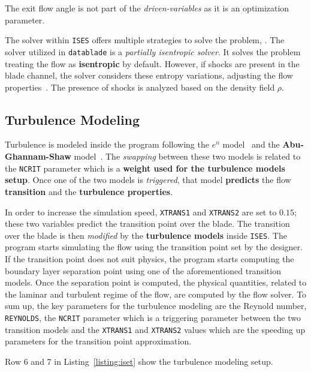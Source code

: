 The exit flow angle is not part of the \textit{driven-variables} as it is an optimization parameter.

The solver within \texttt{ISES} offers multiple strategies to solve the problem, \cite[Ch. 4]{drela1998user}. The solver utilized in \texttt{datablade} is a \textit{partially isentropic solver}. It solves the problem treating the flow as \textbf{isentropic} by default. However, if shocks are present in the blade channel, the solver considers these entropy variations, adjusting the flow properties~\cite{youngren1991viscous}. 
The presence of shocks is analyzed based on the density field $\rho$.

\subsection{Turbulence Modeling}

Turbulence is modeled inside the program \cite[Ch. 4]{drela1998user} following the $e^n$ model~\cite{drela1995mises} and the \textbf{Abu-Ghannam-Shaw} model~\cite{drela1995mises}. The \textit{swapping} between these two models is related to the \texttt{NCRIT} parameter which is a \textbf{weight used for the turbulence models setup}.
Once one of the two models is \textit{triggered}, that model \textbf{predicts} the flow \textbf{transition} and the \textbf{turbulence properties}. 
 
In order to increase the simulation speed, \texttt{XTRANS1} and \texttt{XTRANS2} are set to $0.15$; these two variables predict the transition point over the blade. 
The transition over the blade is then \textit{modified} by the \textbf{turbulence models} inside \texttt{ISES}. The program starts simulating the flow using the transition point set by the designer.
If the transition point does not suit physics, the program starts computing the boundary layer separation point using one of the aforementioned transition models.
Once the separation point is computed, the physical quantities, related to the laminar and turbulent regime of the flow, are computed by the flow solver.
To sum up, the key parameters for the turbulence modeling are the Reynold number, \texttt{REYNOLDS}, the \texttt{NCRIT} parameter which is a triggering parameter between the two transition models 
and the \texttt{XTRANS1} and \texttt{XTRANS2} values which are the speeding up parameters for the transition point approximation.  

Row 6 and 7 in Listing~\ref{listing:iset} show the turbulence modeling setup.

